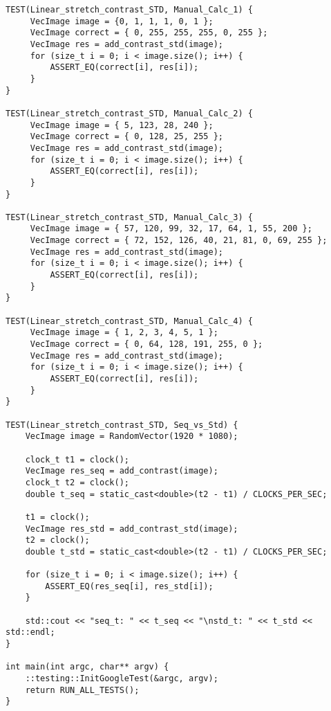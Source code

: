 \documentclass{report}
\begin{document}
\begin{lstlisting}
TEST(Linear_stretch_contrast_STD, Manual_Calc_1) {
     VecImage image = {0, 1, 1, 1, 0, 1 };
     VecImage correct = { 0, 255, 255, 255, 0, 255 };
     VecImage res = add_contrast_std(image);
     for (size_t i = 0; i < image.size(); i++) {
         ASSERT_EQ(correct[i], res[i]);
     }
}

TEST(Linear_stretch_contrast_STD, Manual_Calc_2) {
     VecImage image = { 5, 123, 28, 240 };
     VecImage correct = { 0, 128, 25, 255 };
     VecImage res = add_contrast_std(image);
     for (size_t i = 0; i < image.size(); i++) {
         ASSERT_EQ(correct[i], res[i]);
     }
}

TEST(Linear_stretch_contrast_STD, Manual_Calc_3) {
     VecImage image = { 57, 120, 99, 32, 17, 64, 1, 55, 200 };
     VecImage correct = { 72, 152, 126, 40, 21, 81, 0, 69, 255 };
     VecImage res = add_contrast_std(image);
     for (size_t i = 0; i < image.size(); i++) {
         ASSERT_EQ(correct[i], res[i]);
     }
}

TEST(Linear_stretch_contrast_STD, Manual_Calc_4) {
     VecImage image = { 1, 2, 3, 4, 5, 1 };
     VecImage correct = { 0, 64, 128, 191, 255, 0 };
     VecImage res = add_contrast_std(image);
     for (size_t i = 0; i < image.size(); i++) {
         ASSERT_EQ(correct[i], res[i]);
     }
}

TEST(Linear_stretch_contrast_STD, Seq_vs_Std) {
    VecImage image = RandomVector(1920 * 1080);

    clock_t t1 = clock();
    VecImage res_seq = add_contrast(image);
    clock_t t2 = clock();
    double t_seq = static_cast<double>(t2 - t1) / CLOCKS_PER_SEC;

    t1 = clock();
    VecImage res_std = add_contrast_std(image);
    t2 = clock();
    double t_std = static_cast<double>(t2 - t1) / CLOCKS_PER_SEC;

    for (size_t i = 0; i < image.size(); i++) {
        ASSERT_EQ(res_seq[i], res_std[i]);
    }

    std::cout << "seq_t: " << t_seq << "\nstd_t: " << t_std << std::endl;
}

int main(int argc, char** argv) {
    ::testing::InitGoogleTest(&argc, argv);
    return RUN_ALL_TESTS();
}
    \end{lstlisting}
\end{document}
